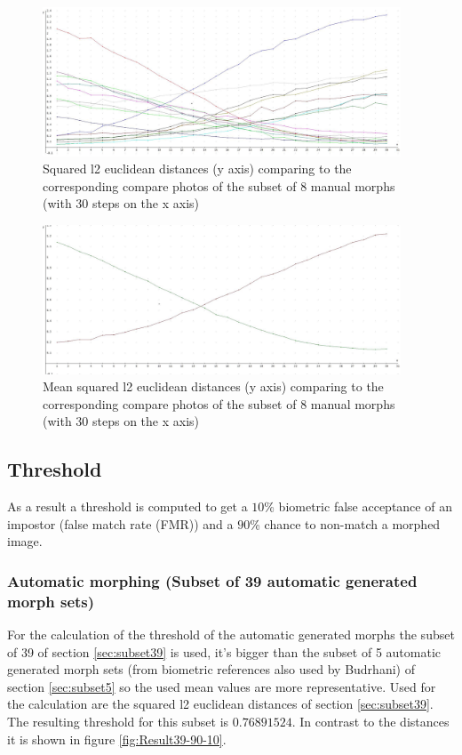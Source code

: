 \begin{figure}[htbp] 
	\centering
		\includegraphics[width=0.95\textwidth]{Resources/result-jannis.jpg}
	\caption{Squared l2 euclidean distances (y axis) comparing to the corresponding compare photos of the subset of 8 manual morphs (with 30 steps on the x axis)}
	\label{fig:result-jannis-all}
\end{figure}
\begin{figure}[htbp] 
	\centering
		\includegraphics[width=0.95\textwidth]{Resources/result-jannis-mean}
	\caption{Mean squared l2 euclidean distances (y axis) comparing to the corresponding compare photos of the subset of 8 manual morphs (with 30 steps on the x axis)}
	\label{fig:result-jannis-mean}
\end{figure}

\newpage
\subsection{Threshold}
As a result a threshold is computed to get a $10$\% biometric false acceptance of an impostor (false match rate (FMR)) and a $90$\% chance to non-match a morphed image.

\subsubsection{Automatic morphing (Subset of 39 automatic generated morph sets)}\label{sec:automorph-thres}
For the calculation of the threshold of the automatic generated morphs the subset of 39 of section \ref{sec:subset39} is used, it's bigger than the subset of 5 automatic generated morph sets (from biometric references also used by Budrhani) of section \ref{sec:subset5} so the used mean values are more representative.
Used for the calculation are the squared l2 euclidean distances of section \ref{sec:subset39}.
The resulting threshold for this subset is \textbf{$0.76891524$}. In contrast to the distances it is shown in figure \ref{fig:Result39-90-10}.


